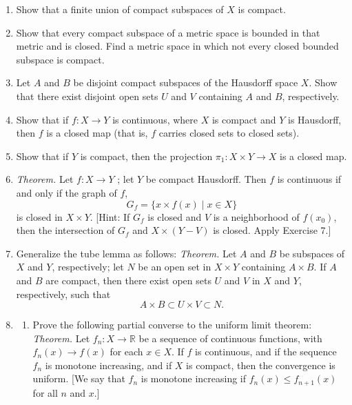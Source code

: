 \begin{enumerate}[itemsep=0.4em, parsep=0pt, topsep=0pt, partopsep=0pt, leftmargin=*, label=\arabic*., ref=\arabic*]
\begin{enumerate}[itemsep=0.2em, parsep=0pt, topsep=0pt, partopsep=0pt, leftmargin=*, label=(\alph*), align=left]
 \item If \(\mathbb{R}\) has the topology consisting of all sets \(A\) such that \(\mathbb{R} - A\) is either countable or all of \(\mathbb{R}\), is \([ {0,1}]\) a compact subspace?
 \end{enumerate}
\item Show that a finite union of compact subspaces of \(X\) is compact.
\item Show that every compact subspace of a metric space is bounded in that metric and is closed. Find a metric space in which not every closed bounded subspace is compact.
\item Let \(A\) and \(B\) be disjoint compact subspaces of the Hausdorff space \(X\). Show that there exist disjoint open sets \(U\) and \(V\) containing \(A\) and \(B\), respectively.
\item Show that if \(f : X \rightarrow Y\) is continuous, where \(X\) is compact and \(Y\) is Hausdorff, then \(f\) is a closed map (that is, \(f\) carries closed sets to closed sets).
\item Show that if \(Y\) is compact, then the projection \({\pi }_{1} : X \times Y \rightarrow X\) is a closed map.
\item \textsl{Theorem.} Let \(f : X \rightarrow Y\) ; let \(Y\) be compact Hausdorff. Then \(f\) is continuous if and only if the graph of \(f\), \[ G_{f} = \{ x \times f(x) \mid x \in X\} \] is closed in \(X \times Y\). [Hint: If \(G_{f}\) is closed and \(V\) is a neighborhood of \(f( x_{0})\), then the intersection of \(G_{f}\) and \(X \times ( {Y - V})\) is closed. Apply Exercise 7.]
\item Generalize the tube lemma as follows: \textsl{Theorem.} Let \(A\) and \(B\) be subspaces of \(X\) and \(Y\), respectively; let \(N\) be an open set in \(X \times Y\) containing \(A \times B\). If \(A\) and \(B\) are compact, then there exist open sets \(U\) and \(V\) in \(X\) and \(Y\), respectively, such that \[ A \times B \subset U \times V \subset N. \]
\item
 \begin{enumerate}[itemsep=0.2em, parsep=0pt, topsep=0pt, partopsep=0pt, leftmargin=*, label=(\alph*), align=left]
 \item Prove the following partial converse to the uniform limit theorem: \textsl{Theorem.} Let \(f_{n} : X \rightarrow \mathbb{R}\) be a sequence of continuous functions, with \(f_{n}(x) \rightarrow f(x)\) for each \(x \in X\). If \(f\) is continuous, and if the sequence \(f_{n}\) is monotone increasing, and if \(X\) is compact, then the convergence is uniform. [We say that \(f_{n}\) is monotone increasing if \(f_{n}(x) \leq {f}_{n + 1}(x)\) for all \(n\) and \(x\).]


\end{enumerate}
\end{enumerate}
